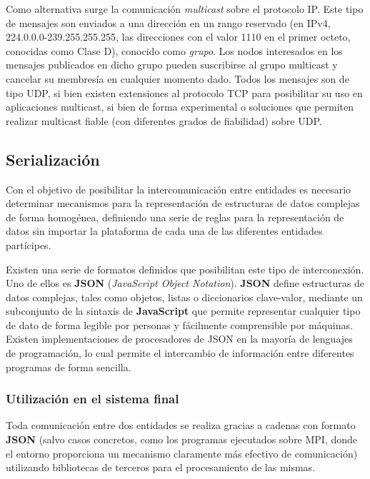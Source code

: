Como alternativa surge la comunicación \textit{multicast} sobre el protocolo IP. Este tipo de mensajes son enviados a una dirección en un rango reservado (en IPv4, 224.0.0.0-239.255.255.255, las direcciones con el valor 1110 en el primer octeto, conocidas como Clase D\cite{rfc791}), conocido como \textit{grupo}. Los nodos interesados en los mensajes publicados en dicho grupo pueden suscribirse al grupo multicast y cancelar su membresía en cualquier momento dado. Todos los mensajes son de tipo UDP, si bien existen extensiones al protocolo TCP para posibilitar su uso en aplicaciones multicast, si bien de forma experimental\cite{1019386, mysore2001ftp, Barcellos01efficienttcp-like, Visoottiviseth01m/tcp:the, talpadereliablemulticast} o soluciones que permiten realizar multicast fiable (con diferentes grados de fiabilidad) sobre UDP\cite{rfc2887}.

\subsection{Serialización}
\label{seralization}
Con el objetivo de posibilitar la intercomunicación entre entidades es necesario determinar mecanismos para la representación de estructuras de datos complejas de forma homogénea, definiendo una serie de reglas para la representación de datos sin importar la plataforma de cada una de las diferentes entidades partícipes.

Existen una serie de formatos definidos que posibilitan este tipo de interconexión. Uno de ellos es \textbf{JSON} (\textit{JavaScript Object Notation})\cite{rfc7159}. \textbf{JSON} define estructuras de datos complejas, tales como objetos, listas o diccionarios clave-valor, mediante un subconjunto de la sintaxis de \textbf{JavaScript} que permite representar cualquier tipo de dato de forma legible por personas y fácilmente comprensible por máquinas. Existen implementaciones de procesadores de JSON en la mayoría de lenguajes de programación, lo cual permite el intercambio de información entre diferentes programas de forma sencilla.

\subsubsection{Utilización en el sistema final}

Toda comunicación entre dos entidades se realiza gracias a cadenas con formato \textbf{JSON} (salvo casos concretos, como los programas ejecutados sobre MPI, donde el entorno proporciona un mecanismo claramente más efectivo de comunicación) utilizando bibliotecas de terceros para el procesamiento de las mismas.

